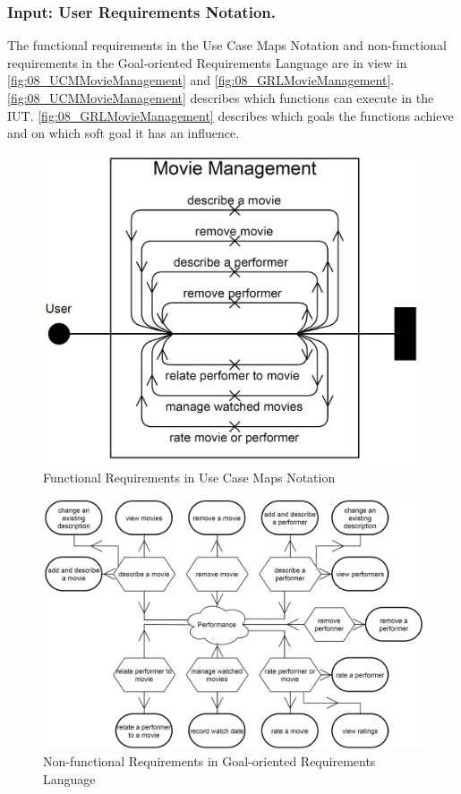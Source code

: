 \subsubsection{Input: User Requirements Notation.}
The functional requirements in the Use Case Maps Notation and non-functional requirements in the Goal-oriented Requirements Language are in view in \autoref{fig:08_UCMMovieManagement} and \autoref{fig:08_GRLMovieManagement}. \autoref{fig:08_UCMMovieManagement} describes which functions can execute in the IUT. \autoref{fig:08_GRLMovieManagement} describes which goals the functions achieve and on which soft goal it has an influence. 
\begin{figure}[h]
	\centering
	\includegraphics[scale=0.29]{../images/08/08_UCMMovieManagement.jpg} 
	\caption{Functional Requirements in Use Case Maps Notation}
	\label{fig:08_UCMMovieManagement}
\end{figure}
\begin{figure}[h!]
	\centering
	\includegraphics[scale=0.4]{../images/08/08_GRLMovieManagement.jpg} 
	\caption{Non-functional Requirements in Goal-oriented Requirements Language}
	\label{fig:08_GRLMovieManagement}
\end{figure}

